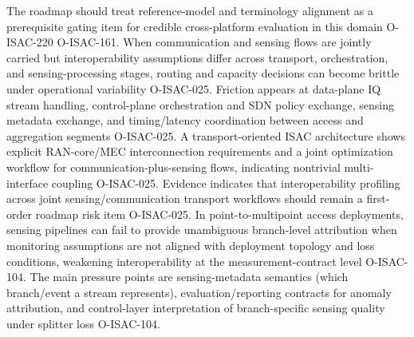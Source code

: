{} The roadmap should treat reference-model and terminology alignment as a prerequisite gating item for credible cross-platform evaluation in this domain O-ISAC-220 O-ISAC-161.\markdownRendererInterblockSeparator
{}
\markdownRendererSectionEnd \markdownRendererSectionBegin
{}\markdownRendererInterblockSeparator
{} When communication and sensing flows are jointly carried but interoperability assumptions differ across transport, orchestration, and sensing-processing stages, routing and capacity decisions can become brittle under operational variability O-ISAC-025.\markdownRendererParagraphSeparator
{} Friction appears at data-plane IQ stream handling, control-plane orchestration and SDN policy exchange, sensing metadata exchange, and timing/latency coordination between access and aggregation segments O-ISAC-025.\markdownRendererParagraphSeparator
{} A transport-oriented ISAC architecture shows explicit RAN-core/MEC interconnection requirements and a joint optimization workflow for communication-plus-sensing flows, indicating nontrivial multi-interface coupling O-ISAC-025.\markdownRendererParagraphSeparator
{} Evidence indicates that interoperability profiling across joint sensing/communication transport workflows should remain a first-order roadmap risk item O-ISAC-025.\markdownRendererInterblockSeparator
{}
\markdownRendererSectionEnd \markdownRendererSectionBegin
{}\markdownRendererInterblockSeparator
{} In point-to-multipoint access deployments, sensing pipelines can fail to provide unambiguous branch-level attribution when monitoring assumptions are not aligned with deployment topology and loss conditions, weakening interoperability at the measurement-contract level O-ISAC-104.\markdownRendererParagraphSeparator
{} The main pressure points are sensing-metadata semantics (which branch/event a stream represents), evaluation/reporting contracts for anomaly attribution, and control-layer interpretation of branch-specific sensing quality under splitter loss O-ISAC-104.\markdownRendererParagraphSeparator
